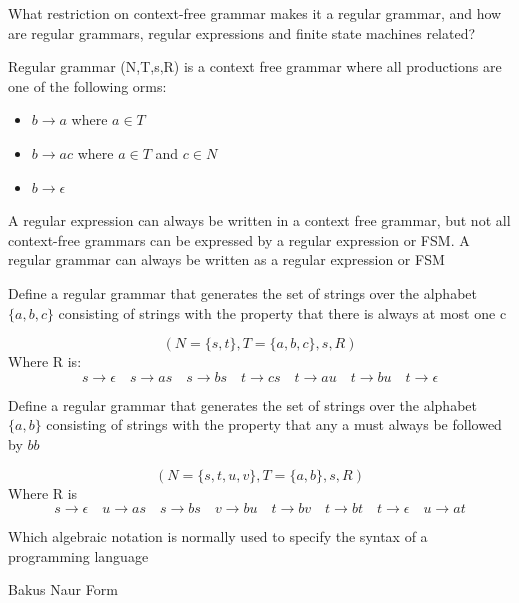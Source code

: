 \documentclass{exam}
\begin{document}
\begin{questions}
\begin{solution}[2in]
\end{solution}

\question[5]What restriction on context-free grammar makes it a regular grammar, and how are regular grammars, regular expressions and finite state machines related?
\begin{solution}[2in]
	Regular grammar (N,T,s,R) is a context free grammar where all productions are one of the following orms:
	\begin{itemize}
		\item $b\rightarrow a$ where $a\in T$
		\item $b\rightarrow ac$ where $a\in T$ and $c\in N$
		\item $b\rightarrow \epsilon$
	\end{itemize}
	
	A regular expression can always be written in a context free grammar, but not all context-free grammars can be expressed by a regular expression or FSM. A regular grammar can always be written as a regular expression or FSM
\end{solution}


\question[5]Define a regular grammar that generates the set of strings over the alphabet $\{a,b,c\}$ consisting of strings with the property that there is always at most one c
\begin{solution}[2in]
	$$(N=\{s,t\},T=\{a,b,c\},s,R)$$
	Where R is:
	$$s\rightarrow \epsilon \quad s\rightarrow as \quad s\rightarrow bs \quad t\rightarrow cs \quad t \rightarrow au \quad t\rightarrow bu \quad t\rightarrow \epsilon$$
\end{solution}


\question[7]Define a regular grammar that generates the set of strings over the alphabet $\{a,b\}$ consisting of strings with the property that any a must always be followed by $bb$
\begin{solution}[2in]
	$$(N=\{s,t,u,v\},T=\{a,b\},s,R)$$
	Where R is
	$$s\rightarrow \epsilon \quad u\rightarrow as \quad s \rightarrow bs \quad v\rightarrow bu \quad t\rightarrow bv \quad t\rightarrow bt \quad t\rightarrow \epsilon \quad u\rightarrow at$$
\end{solution}

\question[1]Which algebraic notation is normally used to specify the syntax of a programming language
\begin{solution}[2in]
	Bakus Naur Form
\end{solution}


\end{questions}
\end{document}
